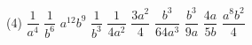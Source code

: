 %
%
    \begin{tasks}(4)
        \task \(\dfrac{1}{a^4}\)
        \task \(\dfrac{1}{b^6}\)
        \task \(a^{12}b^{9}\)
        \task \(\dfrac{1}{b^3}\)
        \task \(\dfrac{1}{4a^2}\)
        \task \(\dfrac{3a^2}{4}\)
        \task \(\dfrac{b^3}{64a^3}\)
        \task \(\dfrac{b^3}{9a}\)
        \task \(\dfrac{4a}{5b}\)
        \task \(\dfrac{a^8b^2}{4}\)
    \end{tasks}

